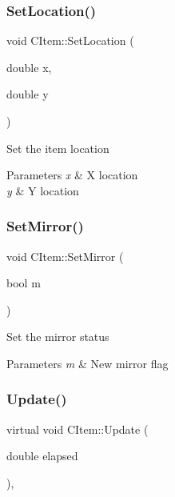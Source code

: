 \subsubsection{\texorpdfstring{Set\+Location()}{SetLocation()}}
{\footnotesize\ttfamily void C\+Item\+::\+Set\+Location (\begin{DoxyParamCaption}\item[{double}]{x,  }\item[{double}]{y }\end{DoxyParamCaption})\hspace{0.3cm}{\ttfamily [inline]}}

Set the item location 
\begin{DoxyParams}{Parameters}
{\em x} & X location \\
\hline
{\em y} & Y location \\
\hline
\end{DoxyParams}
\mbox{\label{class_c_item_a8718f7e56783f5c974fd70b934e4fb79}} 
\subsubsection{\texorpdfstring{Set\+Mirror()}{SetMirror()}}
{\footnotesize\ttfamily void C\+Item\+::\+Set\+Mirror (\begin{DoxyParamCaption}\item[{bool}]{m }\end{DoxyParamCaption})\hspace{0.3cm}{\ttfamily [inline]}}

Set the mirror status 
\begin{DoxyParams}{Parameters}
{\em m} & New mirror flag \\
\hline
\end{DoxyParams}
\mbox{\label{class_c_item_a0e88df0b5e12a93941dcec378797d0fe}} 
\subsubsection{\texorpdfstring{Update()}{Update()}}
{\footnotesize\ttfamily virtual void C\+Item\+::\+Update (\begin{DoxyParamCaption}\item[{double}]{elapsed }\end{DoxyParamCaption})\hspace{0.3cm}{\ttfamily [inline]}, {\ttfamily [virtual]}}

